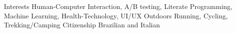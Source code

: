 \begin{cvinterests}
  \cvskill
    {Interests}
    {Human-Computer Interaction, A/B testing, Literate Programming, Machine Learning, Health-Technology, UI/UX}
  \cvskill
    {Outdoors}
    {Running, Cycling, Trekking/Camping}
  \cvskill
    {Citizenship}
    {Brazilian and Italian}
\end{cvinterests}
